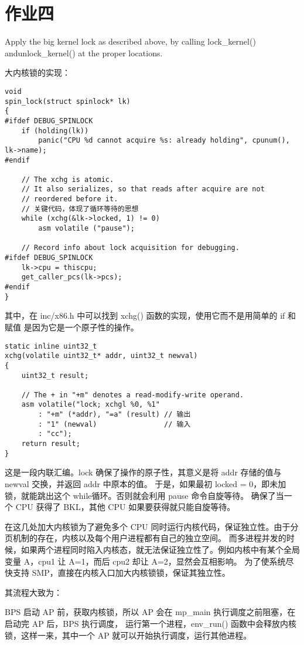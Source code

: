 \documentclass[12pt,a4paper]{article}
\begin{document}
\section{作业四}
Apply the big kernel lock as described above, by calling lock\_kernel() andunlock\_kernel() at the proper locations.

大内核锁的实现：
\begin{lstlisting}[style=CPP]
void
spin_lock(struct spinlock* lk)
{
#ifdef DEBUG_SPINLOCK
    if (holding(lk))
        panic("CPU %d cannot acquire %s: already holding", cpunum(), lk->name);
#endif

    // The xchg is atomic.
    // It also serializes, so that reads after acquire are not
    // reordered before it. 
    // 关键代码，体现了循环等待的思想
    while (xchg(&lk->locked, 1) != 0)
        asm volatile ("pause");

    // Record info about lock acquisition for debugging.
#ifdef DEBUG_SPINLOCK
    lk->cpu = thiscpu;
    get_caller_pcs(lk->pcs);
#endif
}
\end{lstlisting}

其中，在 inc/x86.h 中可以找到 xchg() 函数的实现，使用它而不是用简单的 if 和赋值 是因为它是一个原子性的操作。
\begin{lstlisting}[style=CPP]
static inline uint32_t
xchg(volatile uint32_t* addr, uint32_t newval)
{
    uint32_t result;

    // The + in "+m" denotes a read-modify-write operand.
    asm volatile("lock; xchgl %0, %1"
        : "+m" (*addr), "=a" (result) // 输出
        : "1" (newval)                // 输入
        : "cc");
    return result;
}
\end{lstlisting}

这是一段内联汇编。lock 确保了操作的原子性，其意义是将 addr 存储的值与 newval 交换，并返回 addr 中原本的值。
于是，如果最初 locked = 0，即未加锁，就能跳出这个 while循环。否则就会利用 pause 命令自旋等待。
确保了当一个 CPU 获得了 BKL，其他 CPU 如果要获得就只能自旋等待。

在这几处加大内核锁为了避免多个 CPU 同时运行内核代码，保证独立性。由于分页机制的存在，内核以及每个用户进程都有自己的独立空间。
而多进程并发的时候，如果两个进程同时陷入内核态，就无法保证独立性了。例如内核中有某个全局变量 A，cpu1 让 A=1，而后 cpu2 却让 A=2，显然会互相影响。
为了使系统尽快支持 SMP，直接在内核入口加大内核锁锁，保证其独立性。

其流程大致为：

BPS 启动 AP 前，获取内核锁，所以 AP 会在 mp\_main 执行调度之前阻塞，在启动完 AP 后，BPS 执行调度，
运行第一个进程，env\_run() 函数中会释放内核锁，这样一来，其中一个 AP 就可以开始执行调度，运行其他进程。
\end{document}
